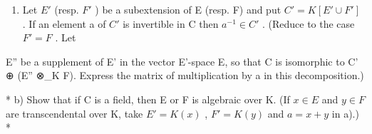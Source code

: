 \begin{enumerate}
\def\labelenumi{\alph{enumi})}
\tightlist
\item
  Let \(E'\) (resp. \(F'\) ) be a subextension of E (resp. F) and put \(C' = K[E' \cup F']\) . If an element a of \(C'\) is invertible in C then \(a^{-1} \in C'\) . (Reduce to the case \(F' = F\) . Let
\end{enumerate}

E'' be a supplement of E' in the vector E'-space E, so that C is isomorphic to C' ⊕ (E'' ⊗\_K F). Express the matrix of multiplication by a in this decomposition.)

* b) Show that if C is a field, then E or F is algebraic over K. (If \(x \in E\) and \(y \in F\) are transcendental over K, take \(E' = K(x)\) , \(F' = K(y)\) and \(a = x + y\) in a).) *
\relax{}
